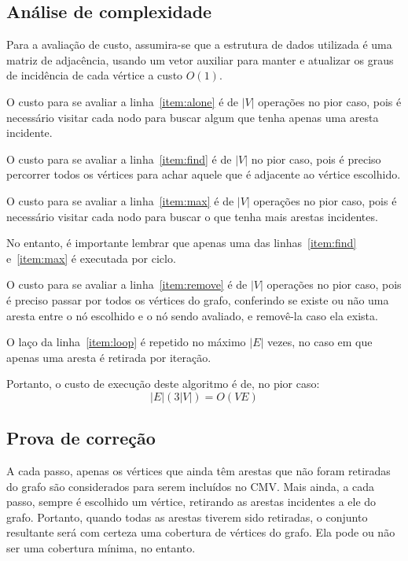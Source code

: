 \subsection{Análise de complexidade}
Para a avaliação de custo, assumira-se que a estrutura de dados
utilizada é uma matriz de adjacência, usando um vetor auxiliar para
manter e atualizar os graus de incidência de cada vértice a custo
$O(1)$.

O custo para se avaliar a linha~\ref{item:alone} é de $\left| V
\right|$ operações no pior caso, pois é necessário visitar cada nodo
para buscar algum que tenha apenas uma aresta incidente.

O custo para se avaliar a linha~\ref{item:find} é de $\left| V
\right|$ no pior caso, pois é preciso percorrer todos os vértices para
achar aquele que é adjacente ao vértice escolhido.

O custo para se avaliar a linha~\ref{item:max} é de $\left| V \right|$
operações no pior caso, pois é necessário visitar cada nodo para
buscar o que tenha mais arestas incidentes.

No entanto, é importante lembrar que apenas uma das
linhas~\ref{item:find} e~\ref{item:max} é executada por ciclo.

O custo para se avaliar a linha~\ref{item:remove} é de $\left| V
\right|$ operações no pior caso, pois é preciso passar por todos os
vértices do grafo, conferindo se existe ou não uma aresta entre o nó
escolhido e o nó sendo avaliado, e removê-la caso ela exista.

O laço da linha~\ref{item:loop} é repetido no máximo $\left| E
\right|$ vezes, no caso em que apenas uma aresta é retirada por
iteração.

Portanto, o custo de execução deste algoritmo é de, no pior caso:
$$\left| E \right| (3 \left| V \right|) = O(VE)$$

\subsection{Prova de correção}
A cada passo, apenas os vértices que ainda têm arestas que não foram
retiradas do grafo são considerados para serem incluídos no CMV. Mais
ainda, a cada passo, sempre é escolhido um vértice, retirando as
arestas incidentes a ele do grafo. Portanto, quando todas as arestas
tiverem sido retiradas, o conjunto resultante será com certeza uma
cobertura de vértices do grafo. Ela pode ou não ser uma cobertura
mínima, no entanto.
